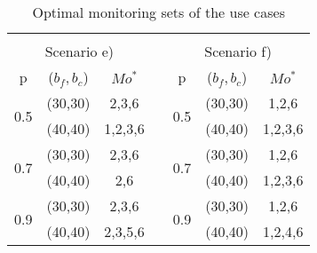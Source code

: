 \begin{table}[]
{\begin{tabular}{ccccccc}
                                           &                                  &                              &                       &                                           &                                  &                              \\
\multicolumn{3}{c}{Scenario e)}                                                                              &                       & \multicolumn{3}{c}{Scenario f)}                                                                             \\ \cline{1-3} \cline{5-7} 
\multicolumn{1}{|c|}{p}                    & \multicolumn{1}{c|}{($b_f,b_c$)} & \multicolumn{1}{c|}{$Mo^*$}  & \multicolumn{1}{c|}{} & \multicolumn{1}{c|}{p}                    & \multicolumn{1}{c|}{($b_f,b_c$)} & \multicolumn{1}{c|}{$Mo^*$}  \\ \cline{1-3} \cline{5-7} 
\multicolumn{1}{|c|}{\multirow{2}{*}{0.5}} & \multicolumn{1}{c|}{(30,30)}     & \multicolumn{1}{c|}{2,3,6}   & \multicolumn{1}{c|}{} & \multicolumn{1}{c|}{\multirow{2}{*}{0.5}} & \multicolumn{1}{c|}{(30,30)}     & \multicolumn{1}{c|}{1,2,6}   \\ \cline{2-3} \cline{6-7} 
\multicolumn{1}{|c|}{}                     & \multicolumn{1}{c|}{(40,40)}     & \multicolumn{1}{c|}{1,2,3,6} & \multicolumn{1}{c|}{} & \multicolumn{1}{c|}{}                     & \multicolumn{1}{c|}{(40,40)}     & \multicolumn{1}{c|}{1,2,3,6} \\ \cline{1-3} \cline{5-7} 
\multicolumn{1}{|c|}{\multirow{2}{*}{0.7}} & \multicolumn{1}{c|}{(30,30)}     & \multicolumn{1}{c|}{2,3,6}   & \multicolumn{1}{c|}{} & \multicolumn{1}{c|}{\multirow{2}{*}{0.7}} & \multicolumn{1}{c|}{(30,30)}     & \multicolumn{1}{c|}{1,2,6}   \\ \cline{2-3} \cline{6-7} 
\multicolumn{1}{|c|}{}                     & \multicolumn{1}{c|}{(40,40)}     & \multicolumn{1}{c|}{2,6}     & \multicolumn{1}{c|}{} & \multicolumn{1}{c|}{}                     & \multicolumn{1}{c|}{(40,40)}     & \multicolumn{1}{c|}{1,2,3,6} \\ \cline{1-3} \cline{5-7} 
\multicolumn{1}{|c|}{\multirow{2}{*}{0.9}} & \multicolumn{1}{c|}{(30,30)}     & \multicolumn{1}{c|}{2,3,6}   & \multicolumn{1}{c|}{} & \multicolumn{1}{c|}{\multirow{2}{*}{0.9}} & \multicolumn{1}{c|}{(30,30)}     & \multicolumn{1}{c|}{1,2,6}   \\ \cline{2-3} \cline{6-7} 
\multicolumn{1}{|c|}{}                     & \multicolumn{1}{c|}{(40,40)}     & \multicolumn{1}{c|}{2,3,5,6} & \multicolumn{1}{c|}{} & \multicolumn{1}{c|}{}                     & \multicolumn{1}{c|}{(40,40)}     & \multicolumn{1}{c|}{1,2,4,6} \\ \cline{2-3} \cline{5-7} 
\end{tabular}%
}
\caption{Optimal monitoring sets of the use cases}
\label{tab:mdp-usecase-optiset}
\end{table}